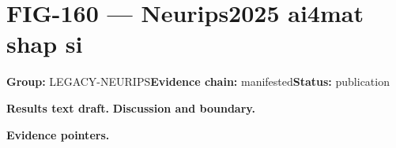 \clearpage
\section{FIG-160 --- Neurips2025 ai4mat shap si}
\label{figpage:fig-160}
\textbf{Group:} LEGACY-NEURIPS\quad \textbf{Evidence chain:} manifested\quad \textbf{Status:} publication

\textbf{Results text draft.} 
\textbf{Discussion and boundary.} 


\textbf{Evidence pointers.}



\vfill
